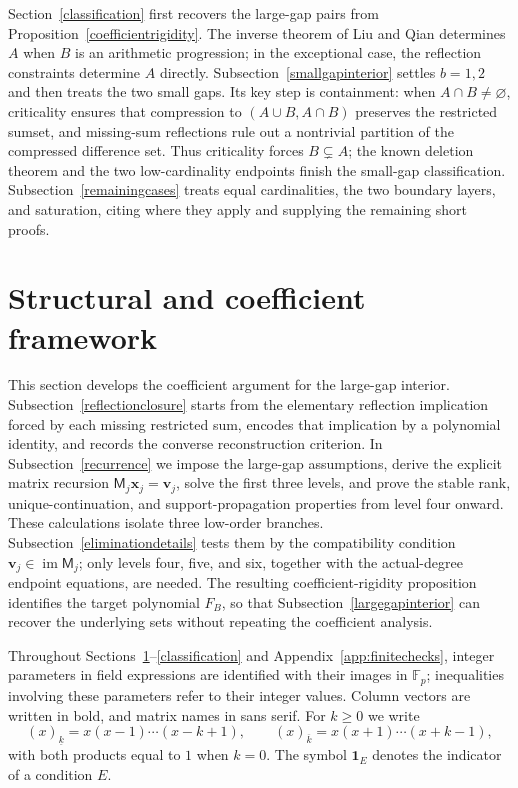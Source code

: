 \documentclass[12pt]{article}
\theoremstyle{remark}
\newcommand{\F}{\mathbb{F}_p}
\newcommand{\fall}[2]{(#1)_{\underline{#2}}}
\newcommand{\rise}[2]{(#1)_{\overline{#2}}}
\newcommand{\ind}{\mathbf 1}
\begin{document}
Section~\ref{classification} first recovers the large-gap pairs from
Proposition~\ref{coefficientrigidity}.  The inverse theorem of Liu and
Qian \cite[Theorem 1.5(ii)]{LQ} determines $A$ when $B$ is an arithmetic progression;
in the exceptional case, the reflection constraints determine $A$ directly.  Subsection~\ref{smallgapinterior} settles $b=1,2$
and then treats the two small gaps.  Its key step is containment:
when $A\cap B\ne\varnothing$, criticality ensures that compression
to $(A\cup B,A\cap B)$ preserves the restricted sumset,
and missing-sum reflections rule out a nontrivial partition of the
compressed difference set.  Thus criticality forces $B\subsetneq A$;
the known deletion theorem and the two low-cardinality endpoints finish
the small-gap classification.  Subsection~\ref{remainingcases} treats
equal cardinalities, the two boundary layers, and saturation, citing
\cite{DGHM,HLY} where they apply and supplying the remaining short proofs.

\section{Structural and coefficient framework}\label{structure}

This section develops the coefficient argument for the large-gap interior.
Subsection~\ref{reflectionclosure} starts from the elementary reflection
implication forced by each missing restricted sum, encodes that implication
by a polynomial identity, and records the converse reconstruction criterion.
In Subsection~\ref{recurrence} we impose the large-gap assumptions,
derive the explicit matrix recursion
$\mathsf M_j\mathbf x_j=\mathbf v_j$, solve the first three levels, and
prove the stable rank, unique-continuation, and support-propagation
properties from level four onward.  These calculations isolate three
low-order branches.  Subsection~\ref{eliminationdetails} tests them by
the compatibility condition $\mathbf v_j\in\operatorname{im}\mathsf M_j$;
only levels four, five, and six, together with the actual-degree endpoint
equations, are needed.  The resulting coefficient-rigidity proposition
identifies the target polynomial $F_B$, so that
Subsection~\ref{largegapinterior} can recover the underlying sets without
repeating the coefficient analysis.

Throughout Sections~\ref{structure}--\ref{classification} and
Appendix~\ref{app:finitechecks}, integer parameters in field expressions
are identified with their images in $\F$; inequalities involving these
parameters refer to their integer values.  Column vectors are written in
bold, and matrix names in sans serif.  For $k\ge0$ we write
\[
 \fall{x}{k}=x(x-1)\cdots(x-k+1),\qquad
 \rise{x}{k}=x(x+1)\cdots(x+k-1),
\]
with both products equal to $1$ when $k=0$.  The symbol $\ind_E$ denotes
the indicator of a condition $E$.
\end{document}
